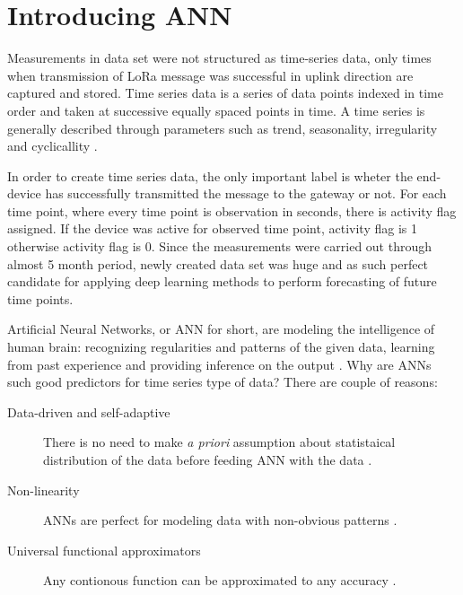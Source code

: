 \documentclass[11pt, a4paper]{article} %
\begin{document}
\section{Introducing ANN}

Measurements in data set were not structured as time-series data, only times when transmission of LoRa message was successful in uplink direction are captured and stored. 
Time series data is a series of data points indexed in time order and taken at successive equally spaced points in time. A time series is generally described through parameters such as trend, seasonality, irregularity and cyclicallity \cite{Adhikari_timeseries}.

In order to create time series data, the only important label is wheter the end-device has successfully transmitted the message to the gateway or not. 
For each time point, where every time point is observation in seconds, there is activity flag assigned. If the device was active for observed time point, activity flag is 1 otherwise activity flag is 0.
Since the measurements were carried out through almost 5 month period, newly created data set was huge and as such perfect candidate for applying deep learning methods to perform forecasting of future time points.

Artificial Neural Networks, or ANN for short, are modeling the intelligence of human brain: recognizing regularities and patterns of the given data, learning from past experience and providing inference on the output \cite{Adhikari_timeseries}.
Why are ANNs such good predictors for time series type of data? There are couple of reasons:
\begin{description}
	\item[Data-driven and self-adaptive] There is no need to make \emph{a priori} assumption about statistaical distribution of the data before feeding ANN with the data \cite{Adhikari_timeseries}.
	\item [Non-linearity] ANNs are perfect for modeling data with non-obvious patterns \cite{Zhang_ann}.
	\item [Universal functional approximators] Any contionous function can be approximated to any accuracy \cite{Hornik_ann}.
\end{description}
\end{document}
